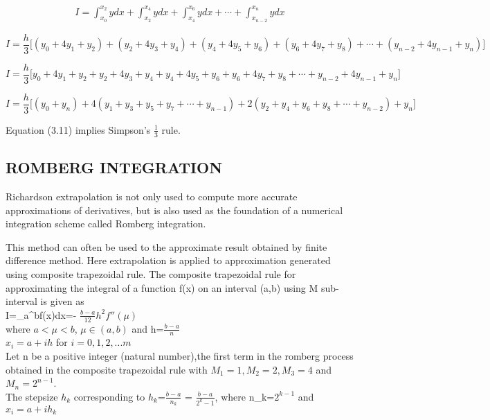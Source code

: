 \documentclass[a4paper,12pt]{report}
\numberwithin{equation}{section}
\begin{document}
\begin{align*}
I=\int_{x_0}^{x_2}ydx+\int_{x_2}^{x_4}ydx+\int_{x_4}^{x_6}ydx+\cdots+\int_{x_{n-2}}^{x_n}ydx
\end{align*}

\begin{equation*}
I=\frac{h}{3}\Big[(y_0+4y_1+y_2)+(y_2+4y_3+y_4)+(y_4+4y_5+y_6)+(y_6+4y_7+y_8)+\cdots+(y_{n-2}+4y_{n-1}+y_n)\Big]
\end{equation*}

\begin{equation*}
I=\frac{h}{3}\Big[y_0+4y_1+y_2+y_2+4y_3+y_4+y_4+4y_5+y_6+y_6+4y_7+y_8+\cdots+y_{n-2}+4y_{n-1}+y_n\Big]
\end{equation*}

\begin{equation}
I=\frac{h}{3}\Big[(y_0+y_n)+4(y_1+y_3+y_5+y_7+\cdots+y_{n-1})+2(y_2+y_4+y_6+y_8+\cdots+y_{n-2})+y_n\Big]
\end{equation}

Equation (3.11) implies Simpson's $\frac{1}{3}$ rule.





\subsection{ROMBERG INTEGRATION}
\indent Richardson extrapolation is not only used to compute more accurate approximations of derivatives, but is also used as the foundation of a numerical integration scheme called Romberg integration. 

\indent This method can often be used to the approximate result obtained by finite difference method. Here extrapolation is applied to approximation generated using composite trapezoidal rule. The composite trapezoidal rule for approximating the integral of a function f(x) on an interval (a,b) using M sub-interval is given as\\
I=\int_{a}^{b}f(x)dx=\Bigg[f(a)+2 $\sum\limits_{i=1}^{n-1} f(x_i)$+f(b)\bigg] - $\frac{b-a}{12}h^2f''(\mu)$\\
where $a<\mu<b$, $\mu\in(a,b)$ and h=$\frac{b-a}{n}$\\
$x_i=a+ih$ for $i=0,1,2,...m$\\

Let n be a positive integer (natural number),the first term in the romberg process obtained in the composite trapezoidal rule with $M_1=1, M_2=2, M_3=4$ and $M_n=2^{n-1}$.\\
\indent The stepsize $h_k$ corresponding to $h_k$=$\frac{b-a}{n_k}$ = $\frac{b-a}{2^k-1}$, where n_k=$2^{k-1}$ and $x_i=a+ih_k$\\
\end{document}
